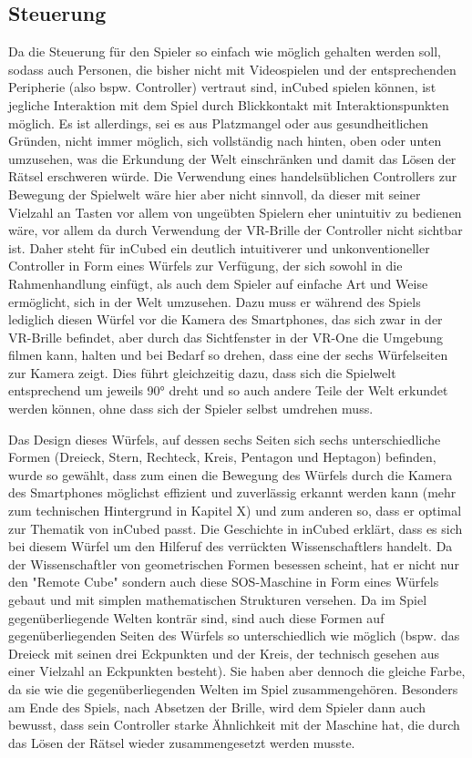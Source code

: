 \subsection{Steuerung}

Da die Steuerung für den Spieler so einfach wie möglich gehalten werden soll, sodass auch Personen, die bisher nicht mit Videospielen und der entsprechenden Peripherie (also bspw. Controller) vertraut sind, inCubed spielen können, ist jegliche Interaktion mit dem Spiel durch Blickkontakt mit Interaktionspunkten möglich. Es ist allerdings, sei es aus Platzmangel oder aus gesundheitlichen Gründen, nicht immer möglich, sich vollständig nach hinten, oben oder unten umzusehen, was die Erkundung der Welt einschränken und damit das Lösen der Rätsel erschweren würde. Die Verwendung eines handelsüblichen Controllers zur Bewegung der Spielwelt wäre hier aber nicht sinnvoll, da dieser mit seiner Vielzahl an Tasten vor allem von ungeübten Spielern eher unintuitiv zu bedienen wäre, vor allem da durch Verwendung der VR-Brille der Controller nicht sichtbar ist. Daher steht für inCubed ein deutlich intuitiverer und unkonventioneller Controller in Form eines Würfels zur Verfügung, der sich sowohl in die Rahmenhandlung einfügt, als auch dem Spieler auf einfache Art und Weise ermöglicht, sich in der Welt umzusehen. Dazu muss er während des Spiels lediglich diesen Würfel vor die Kamera des Smartphones, das sich zwar in der VR-Brille befindet, aber durch das Sichtfenster in der VR-One die Umgebung filmen kann, halten und bei Bedarf so drehen, dass eine der sechs Würfelseiten zur Kamera zeigt. Dies führt gleichzeitig dazu, dass sich die Spielwelt entsprechend um jeweils 90° dreht und so auch andere Teile der Welt erkundet werden können, ohne dass sich der Spieler selbst umdrehen muss.

Das Design dieses Würfels, auf dessen sechs Seiten sich sechs unterschiedliche Formen (Dreieck, Stern, Rechteck, Kreis, Pentagon und Heptagon) befinden, wurde so gewählt, dass zum einen die Bewegung des Würfels durch die Kamera des Smartphones möglichst effizient und zuverlässig erkannt werden kann (mehr zum technischen Hintergrund in Kapitel X) und zum anderen so, dass er optimal zur Thematik von inCubed passt. Die Geschichte in inCubed erklärt, dass es sich bei diesem Würfel um den Hilferuf des verrückten Wissenschaftlers handelt. Da der Wissenschaftler von geometrischen Formen besessen scheint, hat er nicht nur den "Remote Cube" sondern auch diese SOS-Maschine in Form eines Würfels gebaut und mit simplen mathematischen Strukturen versehen. Da im Spiel gegenüberliegende Welten konträr sind, sind auch diese Formen auf gegenüberliegenden Seiten des Würfels so unterschiedlich wie möglich (bspw. das Dreieck mit seinen drei Eckpunkten und der Kreis, der technisch gesehen aus einer Vielzahl an Eckpunkten besteht). Sie haben aber dennoch die gleiche Farbe, da sie wie die gegenüberliegenden Welten im Spiel zusammengehören. Besonders am Ende des Spiels, nach Absetzen der Brille, wird dem Spieler dann auch bewusst, dass sein Controller starke Ähnlichkeit mit der Maschine hat, die durch das Lösen der Rätsel wieder zusammengesetzt werden musste.


